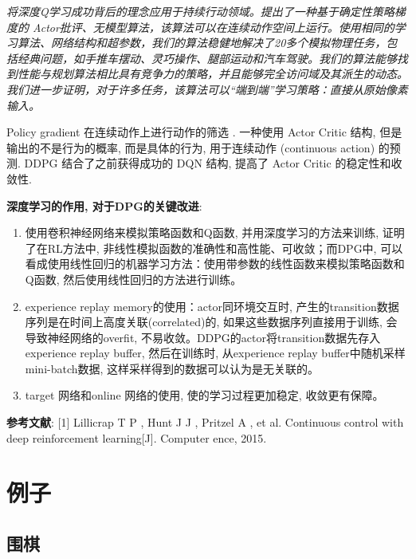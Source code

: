 \documentclass{article}
\begin{document}
        \textit{将深度Q学习成功背后的理念应用于持续行动领域。提出了一种基于确定性策略梯度的 Actor批评、无模型算法，该算法可以在连续动作空间上运行。使用相同的学习算法、网络结构和超参数，我们的算法稳健地解决了20多个模拟物理任务，包括经典问题，如手推车摆动、灵巧操作、腿部运动和汽车驾驶。我们的算法能够找到性能与规划算法相比具有竞争力的策略，并且能够完全访问域及其派生的动态。我们进一步证明，对于许多任务，该算法可以“端到端”学习策略：直接从原始像素输入。}

        
        Policy gradient 在连续动作上进行动作的筛选 . 一种使用 Actor Critic 结构, 但是输出的不是行为的概率, 而是具体的行为, 用于连续动作 (continuous action) 的预测. DDPG 结合了之前获得成功的 DQN 结构, 提高了 Actor Critic 的稳定性和收敛性.
        
        \textbf{深度学习的作用, 对于DPG的关键改进}:
        \begin{enumerate}
            \item 使用卷积神经网络来模拟策略函数和Q函数, 并用深度学习的方法来训练, 证明了在RL方法中, 非线性模拟函数的准确性和高性能、可收敛；而DPG中, 可以看成使用线性回归的机器学习方法：使用带参数的线性函数来模拟策略函数和Q函数, 然后使用线性回归的方法进行训练。
            \item experience replay memory的使用：actor同环境交互时, 产生的transition数据序列是在时间上高度关联(correlated)的, 如果这些数据序列直接用于训练, 会导致神经网络的overfit, 不易收敛。DDPG的actor将transition数据先存入experience replay buffer, 然后在训练时, 从experience replay buffer中随机采样mini-batch数据, 这样采样得到的数据可以认为是无关联的。
            \item target 网络和online 网络的使用,  使的学习过程更加稳定, 收敛更有保障。
        \end{enumerate}
    
        \textbf{参考文献}: [1] Lillicrap T P ,  Hunt J J ,  Pritzel A , et al. Continuous control with deep reinforcement learning[J]. Computer ence, 2015.
        
   
\section{例子}
    \subsection{围棋}
\end{document}
